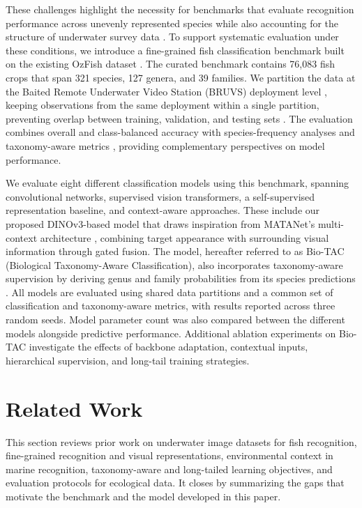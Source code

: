 \documentclass[preprint,12pt]{elsarticle}
\begin{document}
These challenges highlight the necessity for benchmarks that evaluate
recognition performance across unevenly represented species while also
accounting for the structure of underwater survey data
\citep{ref10,ref13,ref21}. To support systematic evaluation
under these conditions, we introduce a fine-grained fish classification
benchmark built on the existing OzFish dataset
\citep{ref22}. The curated benchmark contains
76,083 fish crops that span 321 species, 127 genera, and 39 families. We
partition the data at the Baited Remote Underwater Video Station (BRUVS)
deployment level \citep{ref4}, keeping
observations from the same deployment within a single partition,
preventing overlap between training, validation, and testing sets
\citep{ref17,ref18}. The evaluation combines overall
and class-balanced accuracy with species-frequency analyses
\citep{ref16} and taxonomy-aware metrics
\citep{ref23,ref24}, providing complementary
perspectives on model performance.

We evaluate eight different classification models using this benchmark,
spanning convolutional networks, supervised vision transformers, a
self-supervised representation baseline, and context-aware approaches.
These include our proposed DINOv3-based model
\citep{ref25} that draws inspiration from
MATANet's multi-context architecture
\citep{ref26}, combining target appearance with
surrounding visual information through gated fusion. The model,
hereafter referred to as Bio-TAC (Biological Taxonomy-Aware Classification), also incorporates taxonomy-aware
supervision by deriving genus and family probabilities from its species
predictions \citep{ref24,ref26}. All models are evaluated using
shared data partitions and a common set of classification and
taxonomy-aware metrics, with results reported across three random seeds.
Model parameter count was also compared between the different models
alongside predictive performance. Additional ablation experiments on
Bio-TAC investigate the effects of backbone adaptation, contextual
inputs, hierarchical supervision, and long-tail training strategies.

\section{Related Work}\label{related-work}

This section reviews prior work on underwater image datasets for fish
recognition, fine-grained recognition and visual representations,
environmental context in marine recognition, taxonomy-aware and
long-tailed learning objectives, and evaluation protocols for ecological
data. It closes by summarizing the gaps that motivate the benchmark and
the model developed in this paper.
\end{document}
